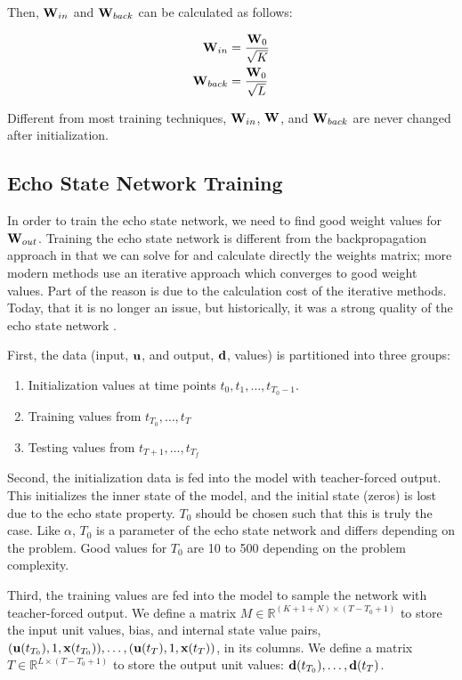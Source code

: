 \documentclass{article}
\begin{document}
Then, $\mathbf{W}_{in}$ and $\mathbf{W}_{back}$ can be calculated as follows:

\begin{align}
    \mathbf{W}_{in} &= \frac{\mathbf{W}_0}{\sqrt{K}} \nonumber \\
    \mathbf{W}_{back} &= \frac{\mathbf{W}_0}{\sqrt{L}} \nonumber
\end{align}

Different from most training techniques, $\mathbf{W}_{in}$, $\mathbf{W}$, and $\mathbf{W}_{back}$ are never
changed after initialization.

\subsection{Echo State Network Training}
\label{sec:etrain}

In order to train the echo state network, we need to find good weight values
for $\mathbf{W}_{out}$. Training the echo state network is different from the
backpropagation approach in that we can solve for and calculate directly the
weights matrix; more modern methods use an iterative approach which converges
to good weight values. Part of the reason is due to the calculation cost of
the iterative methods. Today, that it is no longer an issue, but
historically, it was a strong quality of the echo state network
\cite{jaeger2007echo}.

First, the data (input, $\mathbf{u}$, and output, $\mathbf{d}$, values) is partitioned into
three groups:
\begin{enumerate}
    \item Initialization values at time points
    $t_0, t_1, \dots, t_{T_0-1}$.
    \item Training values from
    $t_{T_0}, \dots, t_T$
    \item Testing values from
    $t_{T+1}, \dots, t_{T_f}$
\end{enumerate}

Second, the initialization data is fed into the model with teacher-forced 
output. This initializes the
inner state of the model, and the initial state (zeros) is lost due to the
echo state property. $T_0$ should be chosen such that this is truly the case.
Like $\alpha$, $T_0$ is a parameter of the echo state network and differs
depending on the problem. Good values for $T_0$ are 10 to 500 depending on
the problem complexity.

Third, the training values are fed into the model to sample the network with 
teacher-forced output. We define a matrix
$M \in \mathbb{R}^{(K + 1 + N) \times (T-T_0+1)}$
to store the input unit values,
bias, and internal state value pairs, $(\mathbf{u}(t_{T_0}), 1, \mathbf{x}(t_{T_0})), \dots,
(\mathbf{u}(t_T), 1, \mathbf{x}(t_T))$, in its columns. We define a matrix
$T \in \mathbb{R}^{L \times (T-T_0+1)}$ to store the 
output unit values: $\mathbf{d}(t_{T_0}), \dots, \mathbf{d}(t_T)$.
\end{document}
